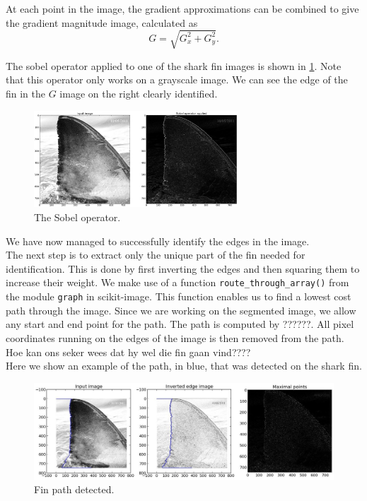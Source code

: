 \documentclass[a4paper,10pt]{article}
\begin{document}
At each point in the image, the gradient approximations can be combined to give
the gradient magnitude image, calculated  as
\[
 G = \sqrt{G_x^2+G_y^2}
.\]

The sobel operator applied to one of the shark fin images is shown in
\ref{sobel}.  Note that this operator only works on a grayscale image.
We can see the edge of the fin in the $G$ image on the right clearly identified.

\begin{figure}[H]
 \centering
 \includegraphics[width=3in]{sobel.jpg}
 \caption{The Sobel operator.}
 \label{sobel}
\end{figure}

We have now managed to successfully identify the edges in the image. \\

The next step is to extract only the unique part of the fin needed for
identification.  This is done by first inverting the edges and then squaring 
them to increase their weight.  We make use of a function 
\texttt{route\_through\_array()} from the module \texttt{graph} in scikit-image.
 This function enables us to find a lowest cost path through the image.
Since we are working on the segmented image, we allow any start and end point
for the path.  The path is computed by ??????.  All pixel coordinates running 
on the edges of the image is then removed from the path. Hoe kan ons seker wees
dat hy wel die fin gaan vind????  \\

Here we show an example of the path, in blue, that was detected on the shark
fin.
\begin{figure}[H]
 \centering
 \includegraphics[width=5in]{finpath.jpg}
 \caption{Fin path detected.}
 \label{fin}
\end{figure}
\end{document}
